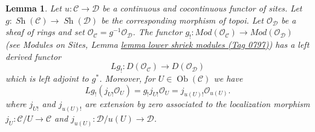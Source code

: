 \documentclass{amsart}
\theoremstyle{plain}
\newtheorem{lemma}[subsection]{Lemma}
\theoremstyle{definition}
\theoremstyle{remark}
\numberwithin{equation}{subsection}
\def\Ob{\mathop{\mathrm{Ob}}\nolimits}
\def\Sh{\mathop{\mathit{Sh}}\nolimits}
\begin{document}
\begin{lemma}
\label{lemma-existence-derived-lower-shriek}
Let $u : \mathcal{C} \to \mathcal{D}$ be a continuous and cocontinuous
functor of sites. Let $g : \Sh(\mathcal{C}) \to \Sh(\mathcal{D})$ be the
corresponding morphism of topoi. Let $\mathcal{O}_\mathcal{D}$
be a sheaf of rings and set
$\mathcal{O}_\mathcal{C} = g^{-1}\mathcal{O}_\mathcal{D}$.
The functor $g_! : \textit{Mod}(\mathcal{O}_\mathcal{C}) \to
\textit{Mod}(\mathcal{O}_\mathcal{D})$
(see
Modules on Sites, Lemma \href{https://stacks.math.columbia.edu/tag/0797}{lemma lower shriek modules (Tag 0797)})
has a left derived functor
$$
Lg_! : D(\mathcal{O}_\mathcal{C}) \longrightarrow D(\mathcal{O}_\mathcal{D})
$$
which is left adjoint to $g^*$. Moreover, for $U \in \Ob(\mathcal{C})$ we
have
$$
Lg_!(j_{U!}\mathcal{O}_U) =
g_!j_{U!}\mathcal{O}_U =
j_{u(U)!} \mathcal{O}_{u(U)}.
$$
where $j_{U!}$ and $j_{u(U)!}$ are extension by zero associated to the
localization morphism
$j_U : \mathcal{C}/U \to \mathcal{C}$ and
$j_{u(U)} : \mathcal{D}/u(U) \to \mathcal{D}$.
\end{lemma}
\end{document}

